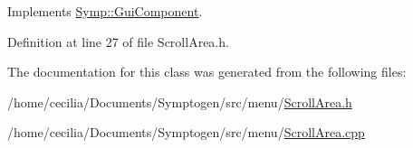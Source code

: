 Implements \hyperlink{class_symp_1_1_gui_component_add73e07ea0a3c9c1c90640e783a3b5de}{Symp\-::\-Gui\-Component}.



Definition at line 27 of file Scroll\-Area.\-h.



The documentation for this class was generated from the following files\-:\begin{DoxyCompactItemize}
\item 
/home/cecilia/\-Documents/\-Symptogen/src/menu/\hyperlink{_scroll_area_8h}{Scroll\-Area.\-h}\item 
/home/cecilia/\-Documents/\-Symptogen/src/menu/\hyperlink{_scroll_area_8cpp}{Scroll\-Area.\-cpp}\end{DoxyCompactItemize}
